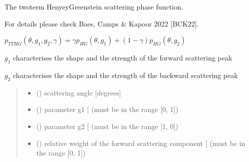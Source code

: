 \documentclass[letterpaper,10pt,english]{sphinxmanual}
\begin{document}
\begin{fulllineitems}
\label{\detokenize{06_anisotropy_factor:skinoptics.anisotropy_factor.ptheta_TTHG}}
\pysigstartsignatures
{}
\pysigstopsignatures
\begin{DUlineblock}{0em}
\item[] The two\sphinxhyphen{}term Henyey\sphinxhyphen{}Greenstein scattering phase function.
\item[] For details please check Baes, Camps \& Kapoor 2022 {[}BCK22{]}.
\end{DUlineblock}

\sphinxAtStartPar
\(p_{TTHG}(\theta, g_1, g_2, \gamma) = \gamma p_{HG}(\theta, g_1) + (1 - \gamma) p_{HG}(\theta, g_2)\)

\sphinxAtStartPar
\(g_1\) characterises the shape and the strength of the forward scattering peak

\sphinxAtStartPar
\(g_2\) characterises the shape and the strength of the backward scattering peak
\begin{quote}\begin{description}
\begin{itemize}
\item {} 
\sphinxAtStartPar
{} () \textendash{} scattering angle {[}degrees{]}

\item {} 
\sphinxAtStartPar
{} () \textendash{} parameter g1 {[}\sphinxhyphen{}{]} (must be in the range {[}0, 1{]})

\item {} 
\sphinxAtStartPar
{} () \textendash{} parameter g2 {[}\sphinxhyphen{}{]} (must be in the range {[}\sphinxhyphen{}1, 0{]})

\item {} 
\sphinxAtStartPar
{} () \textendash{} relative weight of the forward scattering component {[}\sphinxhyphen{}{]} (must be in the range {[}0, 1{]})


\end{itemize}
\end{description}
\end{quote}
\end{fulllineitems}
\end{document}
